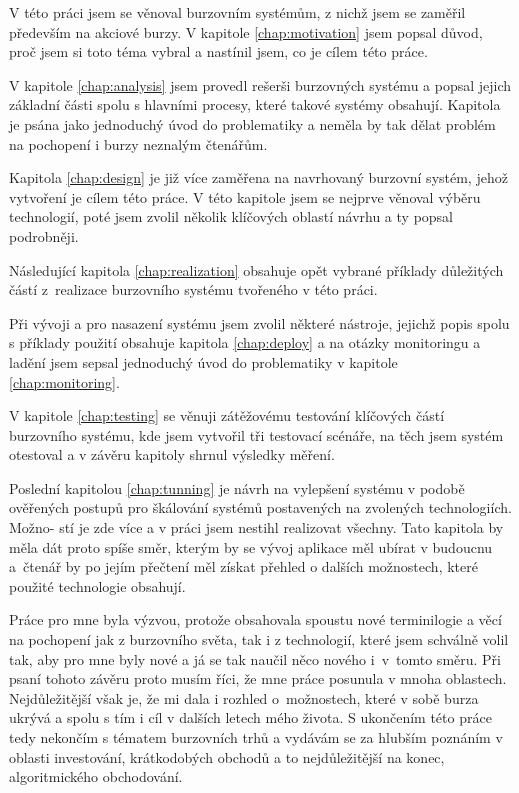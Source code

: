 \documentclass[thesis=M,czech]{FITthesis}[2012/06/26]
\begin{document}
	
\begin{conclusion}
\label{conclusion}

	V této práci jsem se věnoval burzovním systémům, z nichž jsem se zaměřil především na akciové burzy. V kapitole \ref{chap:motivation} jsem popsal důvod, proč jsem si toto téma vybral a nastínil jsem, co je cílem této práce.
	
	V kapitole \ref{chap:analysis} jsem provedl rešerši burzovných systému a popsal jejich základní části spolu s hlavními procesy, které takové systémy obsahují. Kapitola je psána jako jednoduchý úvod do problematiky a neměla by tak dělat problém na pochopení i burzy neznalým čtenářům.
	
	Kapitola \ref{chap:design} je již více zaměřena na navrhovaný burzovní systém, jehož vytvoření je cílem této práce. V této kapitole jsem se nejprve věnoval výběru technologií, poté jsem zvolil několik klíčových oblastí návrhu a ty popsal podrobněji.
	
	Následující kapitola \ref{chap:realization} obsahuje opět vybrané příklady důležitých částí z~realizace burzovního systému tvořeného v této práci.
	
	Při vývoji a pro nasazení systému jsem zvolil některé nástroje, jejichž popis spolu s příklady použití obsahuje kapitola \ref{chap:deploy} a na otázky monitoringu a ladění jsem sepsal jednoduchý úvod do problematiky v kapitole \ref{chap:monitoring}.
	
	V kapitole \ref{chap:testing} se věnuji zátěžovému testování klíčových částí burzovního systému, kde jsem vytvořil tři testovací scénáře, na těch jsem systém otestoval a v závěru kapitoly shrnul výsledky měření.
	
	Poslední kapitolou \ref{chap:tunning} je návrh na vylepšení systému v podobě ověřených postupů pro škálování systémů postavených na zvolených technologiích. Možno- stí je zde více a v práci jsem nestihl realizovat všechny. Tato kapitola by měla dát proto spíše směr, kterým by se vývoj aplikace měl ubírat v budoucnu a~čtenář by po jejím přečtení měl získat přehled o dalších možnostech, které použité technologie obsahují.

	Práce pro mne byla výzvou, protože obsahovala spoustu nové terminilogie a věcí na pochopení jak z burzovního světa, tak i z technologií, které jsem schválně volil tak, aby pro mne byly nové a já se tak naučil něco nového i~v~tomto směru. Při psaní tohoto závěru proto musím říci, že mne práce posunula v mnoha oblastech. Nejdůležitější však je, že mi dala i rozhled o~možnostech, které v sobě burza ukrývá a spolu s tím i cíl v dalších letech mého života. S ukončením této práce tedy nekončím s tématem burzovních trhů a vydávám se za hlubším poznáním v oblasti investování, krátkodobých obchodů a to nejdůležitější na konec, algoritmického obchodování.
	
\end{conclusion}
\end{document}
